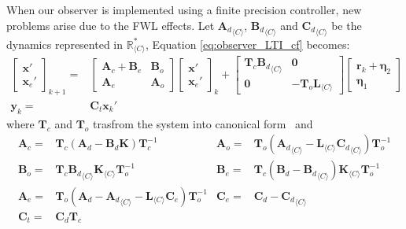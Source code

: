 \documentclass[sigconf]{llncs}
\newcommand{\mat}[1]{\boldsymbol{#1}}
\renewcommand{\vec}[1]{\boldsymbol{#1}}
\begin{document}
When our observer is implemented using a finite precision controller, new
problems arise due to the FWL effects.  Let ${\mat{A}_d}_{\langle C
\rangle}$, ${\mat{B}_d}_{\langle C \rangle}$ and ${\mat{C}_d}_{\langle C
\rangle}$ be the dynamics represented in $\mathbb{R}_{\langle C\rangle}^*$,
Equation \eqref{eq:observer_LTI_cf} becomes:
%
\begin{align}
\left [\begin{array}{c}\vec{x}'\\ \vec{x}_e' \end{array}\right]_{k+1}
=& \left [\begin{array}{cc}\mat{A}_{c}+\mat{B}_{e}&\mat{B}_{o}\\ \mat{A}_{e}&\mat{A}_{o}\end{array}\right]
\left [\begin{array}{c}\vec{x}'\\ \vec{x}_e' \end{array}\right]_k
+\left[\begin{array}{cc}\mat{T}_c{\mat{B}_d}_{\langle C \rangle}&\mat{0}\\\mat{0}&-\mat{T}_o\mat{L}_{\langle C \rangle}\end{array}\right]\left [\begin{array}{c} \vec{r}_k + \vec{\eta}_2\\ \vec{\eta}_1\end{array}\right]\nonumber\\
\vec{y}_k=&\mat{C}_{t}\vec{x}_k'%
\label{eq:observer_LTI_FWL_cf}
\end{align}
where $\mat{T}_c$ and $\mat{T}_o$ trasfrom the system into canonical form~\cite{Astrom08} and
{\setlength{\abovedisplayskip}{2pt}
\setlength{\belowdisplayskip}{2pt}
\begin{align*}
\mat{A}_{c}=&\mat{T}_c\left(\mat{A}_d-\mat{B}_d\mat{K}\right)\mat{T}_c^{-1}&
\mat{A}_{o}=&\mat{T}_o\left({\mat{A}_d}_{\langle C \rangle}-\mat{L}_{\langle C \rangle}{\mat{C}_d}_{\langle C \rangle}\right)\mat{T}_o^{-1}\\
\mat{B}_{o}=&\mat{T}_c{\mat{B}_d}_{\langle C \rangle}\mat{K}_{\langle C \rangle}\mat{T}_o^{-1}&
\mat{B}_{e}=&\mat{T}_c(\mat{B}_d-{\mat{B}_d}_{\langle C \rangle})\mat{K}_{\langle C \rangle}\mat{T}_o^{-1}\\
\mat{A}_{e}=&\mat{T}_o\left(\mat{A}_d-{\mat{A}_d}_{\langle C \rangle}-\mat{L}_{\langle C \rangle}\mat{C}_e\right)\mat{T}_o^{-1}&
\mat{C}_{e}=&\mat{C}_d-{\mat{C}_d}_{\langle C \rangle}\\
\mat{C}_t=&\mat{C}_d\mat{T}_c
\end{align*}
}
\end{document}
